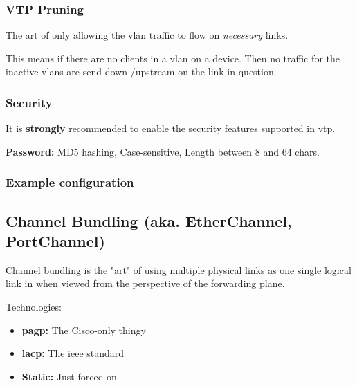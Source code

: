 \subsubsection{VTP Pruning}
The art of only allowing the \gls{vlan} traffic to flow on \textit{necessary} links.

This means if there are no clients in a \gls{vlan} on a device. Then no traffic for the inactive \gls{vlan}s are send down-/upstream on the link in question.


\subsubsection{Security}
It is \textbf{strongly} recommended to enable the security features supported in \gls{vtp}.

\textbf{Password:} MD5 hashing, Case-sensitive, Length between 8 and 64 chars.


\subsubsection{Example configuration}


\subsection{Channel Bundling (aka. EtherChannel, PortChannel)}
Channel bundling is the "art" of using multiple physical links as one single logical link in when viewed from the perspective of the forwarding plane.

Technologies:
\begin{itemize}
    \item \textbf{\gls{pagp}:} The Cisco-only thingy
    \item \textbf{\gls{lacp}:} The \gls{ieee} standard
    \item \textbf{Static:} Just forced on
\end{itemize}

